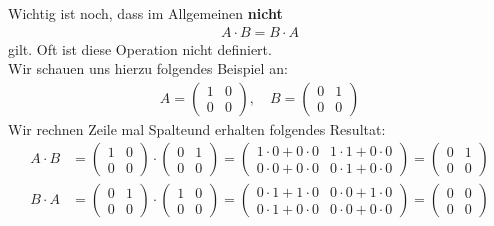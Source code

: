 \newpage
Wichtig ist noch, dass im Allgemeinen \textbf{nicht}
\begin{align*}
A \cdot B = B \cdot A
\end{align*}
gilt. 
Oft ist diese Operation nicht definiert.\\
Wir schauen uns hierzu folgendes Beispiel an:
\begin{align*}
A =
\begin{pmatrix}
1 & 0 \\
0 & 0
\end{pmatrix},
\quad
B = 
\begin{pmatrix}
0 & 1 \\
0 & 0
\end{pmatrix}
\end{align*}
Wir rechnen \glqq Zeile mal Spalte\grqq und erhalten folgendes Resultat:
\begin{align*}
A \cdot B 
&= 
\begin{pmatrix}
1 & 0 \\
0 & 0
\end{pmatrix}
\cdot
\begin{pmatrix}
0 & 1 \\
0 & 0
\end{pmatrix}
=
\begin{pmatrix}
1\cdot 0 + 0 \cdot 0 & 1 \cdot 1 + 0 \cdot 0 \\
0\cdot 0+ 0 \cdot 0 & 0\cdot 1+ 0 \cdot 0 
\end{pmatrix}
=
\begin{pmatrix}
0 & 1 \\
0 & 0
\end{pmatrix}
\\
B \cdot A
&=
\begin{pmatrix}
0 & 1 \\
0 & 0
\end{pmatrix}
\cdot 
\begin{pmatrix}
1 & 0 \\
0 & 0
\end{pmatrix}
=
\begin{pmatrix}
0\cdot 1 + 1 \cdot 0 & 0 \cdot 0 + 1 \cdot 0 \\
0\cdot 1+ 0 \cdot 0 & 0\cdot 0+ 0 \cdot 0 
\end{pmatrix}
=
\begin{pmatrix}
0 & 0 \\
0 & 0
\end{pmatrix}
\end{align*}
